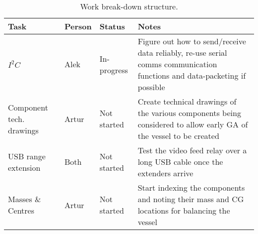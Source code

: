 \documentclass[11pt,a4paper,oneside]{report}
\begin{document}
\begin{table}[h]
\caption{Work break-down structure.}
\begin{tabularx}{\textwidth}{@{}lllX@{}}
\toprule
\textbf{Task} & \textbf{Person} & \textbf{Status} & \textbf{Notes} \\ \midrule
$I^2C$        & Alek            & In-progress     & Figure out how to send/receive data reliably, re-use serial comms 
	communication functions and data-packeting if possible \\
Component tech. drawings & Artur & Not started    & Create technical drawings of the various
	components being considered to allow early GA of the vessel to be created  \\
USB range extension & Both      & Not started     & Test the video feed relay over a long USB cable once
	the extenders arrive \\
Masses \& Centres & Artur       & Not started     & Start indexing the components and noting their
	mass and CG locations for balancing the vessel  \\ \bottomrule
\end{tabularx}
\end{table}
\end{document}
